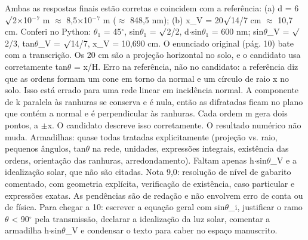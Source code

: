 \documentclass{article}%
\begin{document}
Ambas as respostas finais estão corretas e coincidem com a referência: (a) d = 6$\surd$2$\times$10$^{-}$$^{7}$ m $\approx$ 8,5$\times$10$^{-}$$^{7}$ m ($\approx$ 848,5 nm); (b) x\_V = 20$\surd$14/7 cm $\approx$ 10,7 cm. Conferi no Python: $\theta$$_{1}$ = 45$^\circ$, sin$\theta$$_{1}$ = $\surd$2/2, d$\cdot$sin$\theta$$_{1}$ = 600 nm; sin$\theta$\_V = $\surd$2/3, tan$\theta$\_V = $\surd$14/7, x\_V = 10,690 cm. O enunciado original (pág. 10) bate com a transcrição. Os 20 cm são a projeção horizontal no solo, e o candidato usa corretamente tan$\theta$ = x/H.\newline%
\newline%
Erro na referência, não no candidato: a referência diz que as ordens formam um cone em torno da normal e um círculo de raio x no solo. Isso está errado para uma rede linear em incidência normal. A componente de k paralela às ranhuras se conserva e é nula, então as difratadas ficam no plano que contém a normal e é perpendicular às ranhuras. Cada ordem m gera dois pontos, a $\pm$x. O candidato descreve isso corretamente. O resultado numérico não muda.\newline%
\newline%
Armadilhas: quase todas tratadas explicitamente (projeção vs. raio, pequenos ângulos, tan$\theta$ na rede, unidades, expressões integrais, existência das ordens, orientação das ranhuras, arredondamento). Faltam apenas h$\cdot$sin$\theta$\_V e a idealização solar, que não são citadas.\newline%
\newline%
Nota 9,0: resolução de nível de gabarito comentado, com geometria explícita, verificação de existência, caso particular e expressões exatas. As pendências são de redação e não envolvem erro de conta ou de física. Para chegar a 10: escrever a equação geral com sin$\theta$\_i, justificar o ramo $\theta$ < 90$^\circ$ pela transmissão, declarar a idealização da luz solar, comentar a armadilha h$\cdot$sin$\theta$\_V e condensar o texto para caber no espaço manuscrito.%
$$
\end{document}
